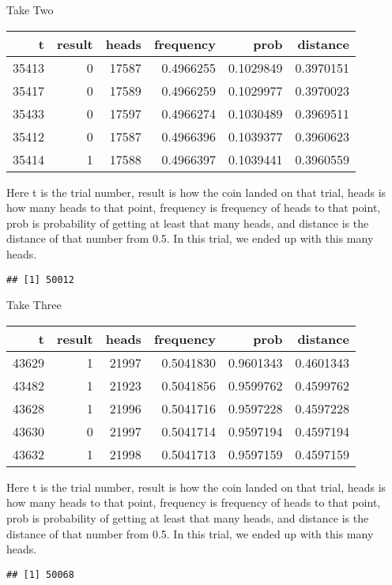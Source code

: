 \documentclass[
  ignorenonframetext,
]{beamer}
\renewcommand{\,}{\text{, }}
\begin{document}
\begin{frame}[fragile]{Take Two}
\protect\hypertarget{take-two}{}

\begin{longtable}[]{@{}rrrrrr@{}}
\toprule
t & result & heads & frequency & prob & distance\tabularnewline
\midrule
\endhead
35413 & 0 & 17587 & 0.4966255 & 0.1029849 & 0.3970151\tabularnewline
35417 & 0 & 17589 & 0.4966259 & 0.1029977 & 0.3970023\tabularnewline
35433 & 0 & 17597 & 0.4966274 & 0.1030489 & 0.3969511\tabularnewline
35412 & 0 & 17587 & 0.4966396 & 0.1039377 & 0.3960623\tabularnewline
35414 & 1 & 17588 & 0.4966397 & 0.1039441 & 0.3960559\tabularnewline
\bottomrule
\end{longtable}

Here t is the trial number, result is how the coin landed on that trial,
heads is how many heads to that point, frequency is frequency of heads
to that point, prob is probability of getting at least that many heads,
and distance is the distance of that number from 0.5. In this trial, we
ended up with this many heads.

\begin{verbatim}
## [1] 50012
\end{verbatim}

\end{frame}

\begin{frame}[fragile]{Take Three}
\protect\hypertarget{take-three}{}

\begin{longtable}[]{@{}rrrrrr@{}}
\toprule
t & result & heads & frequency & prob & distance\tabularnewline
\midrule
\endhead
43629 & 1 & 21997 & 0.5041830 & 0.9601343 & 0.4601343\tabularnewline
43482 & 1 & 21923 & 0.5041856 & 0.9599762 & 0.4599762\tabularnewline
43628 & 1 & 21996 & 0.5041716 & 0.9597228 & 0.4597228\tabularnewline
43630 & 0 & 21997 & 0.5041714 & 0.9597194 & 0.4597194\tabularnewline
43632 & 1 & 21998 & 0.5041713 & 0.9597159 & 0.4597159\tabularnewline
\bottomrule
\end{longtable}

Here t is the trial number, result is how the coin landed on that trial,
heads is how many heads to that point, frequency is frequency of heads
to that point, prob is probability of getting at least that many heads,
and distance is the distance of that number from 0.5. In this trial, we
ended up with this many heads.

\begin{verbatim}
## [1] 50068
\end{verbatim}

\end{frame}
\end{document}
